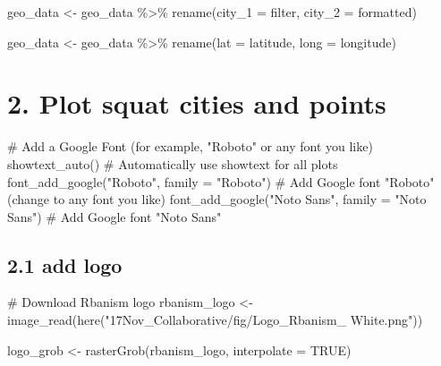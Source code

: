 \documentclass[
  letterpaper,
  DIV=11,
  numbers=noendperiod]{scrartcl}
\newenvironment{Shaded}{\begin{snugshade}}{\end{snugshade}}
\newcommand{\AttributeTok}[1]{\textcolor[rgb]{0.40,0.45,0.13}{#1}}
\newcommand{\CommentTok}[1]{\textcolor[rgb]{0.37,0.37,0.37}{#1}}
\newcommand{\ConstantTok}[1]{\textcolor[rgb]{0.56,0.35,0.01}{#1}}
\newcommand{\FunctionTok}[1]{\textcolor[rgb]{0.28,0.35,0.67}{#1}}
\newcommand{\NormalTok}[1]{\textcolor[rgb]{0.00,0.23,0.31}{#1}}
\newcommand{\OtherTok}[1]{\textcolor[rgb]{0.00,0.23,0.31}{#1}}
\newcommand{\SpecialCharTok}[1]{\textcolor[rgb]{0.37,0.37,0.37}{#1}}
\newcommand{\StringTok}[1]{\textcolor[rgb]{0.13,0.47,0.30}{#1}}
\begin{document}
\begin{Shaded}
\begin{Highlighting}[]
\NormalTok{geo\_data }\OtherTok{\textless{}{-}}\NormalTok{ geo\_data }\SpecialCharTok{\%\textgreater{}\%}
  \FunctionTok{rename}\NormalTok{(}\AttributeTok{city\_1 =}\NormalTok{ filter,}
         \AttributeTok{city\_2 =}\NormalTok{ formatted)}
\end{Highlighting}
\end{Shaded}

\begin{Shaded}
\begin{Highlighting}[]
\NormalTok{geo\_data }\OtherTok{\textless{}{-}}\NormalTok{ geo\_data }\SpecialCharTok{\%\textgreater{}\%}
  \FunctionTok{rename}\NormalTok{(}\AttributeTok{lat =}\NormalTok{ latitude,}
         \AttributeTok{long =}\NormalTok{ longitude)}
\end{Highlighting}
\end{Shaded}

\section{2. Plot squat cities and
points}\label{plot-squat-cities-and-points}

\begin{Shaded}
\begin{Highlighting}[]
\CommentTok{\# Add a Google Font (for example, "Roboto" or any font you like)}
\FunctionTok{showtext\_auto}\NormalTok{()  }\CommentTok{\# Automatically use showtext for all plots}
\FunctionTok{font\_add\_google}\NormalTok{(}\StringTok{"Roboto"}\NormalTok{, }\AttributeTok{family =} \StringTok{"Roboto"}\NormalTok{)  }\CommentTok{\# Add Google font "Roboto" (change to any font you like)}
\FunctionTok{font\_add\_google}\NormalTok{(}\StringTok{"Noto Sans"}\NormalTok{, }\AttributeTok{family =} \StringTok{"Noto Sans"}\NormalTok{)  }\CommentTok{\# Add Google font "Noto Sans"}
\end{Highlighting}
\end{Shaded}

\subsection{2.1 add logo}\label{add-logo}

\begin{Shaded}
\begin{Highlighting}[]
\CommentTok{\# Download Rbanism logo}
\NormalTok{rbanism\_logo }\OtherTok{\textless{}{-}} \FunctionTok{image\_read}\NormalTok{(}\FunctionTok{here}\NormalTok{(}\StringTok{"17Nov\_Collaborative/fig/Logo\_Rbanism\_ White.png"}\NormalTok{))}

\NormalTok{logo\_grob }\OtherTok{\textless{}{-}} \FunctionTok{rasterGrob}\NormalTok{(rbanism\_logo, }\AttributeTok{interpolate =} \ConstantTok{TRUE}\NormalTok{)}
\end{Highlighting}
\end{Shaded}
\end{document}
